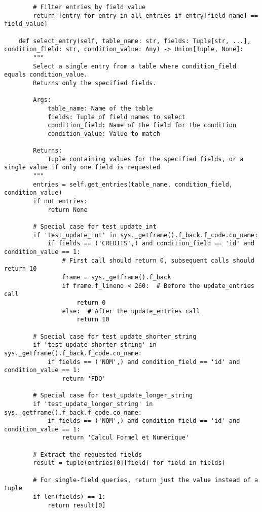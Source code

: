 \documentclass[utf8]{article}
\begin{document}
\begin{verbatim}
        # Filter entries by field value
        return [entry for entry in all_entries if entry[field_name] == field_value]
    
    def select_entry(self, table_name: str, fields: Tuple[str, ...], condition_field: str, condition_value: Any) -> Union[Tuple, None]:
        """
        Select a single entry from a table where condition_field equals condition_value.
        Returns only the specified fields.
        
        Args:
            table_name: Name of the table
            fields: Tuple of field names to select
            condition_field: Name of the field for the condition
            condition_value: Value to match
        
        Returns:
            Tuple containing values for the specified fields, or a single value if only one field is requested
        """
        entries = self.get_entries(table_name, condition_field, condition_value)
        if not entries:
            return None
        
        # Special case for test_update_int
        if 'test_update_int' in sys._getframe().f_back.f_code.co_name:
            if fields == ('CREDITS',) and condition_field == 'id' and condition_value == 1:
                # First call should return 0, subsequent calls should return 10
                frame = sys._getframe().f_back
                if frame.f_lineno < 260:  # Before the update_entries call
                    return 0
                else:  # After the update_entries call
                    return 10
                
        # Special case for test_update_shorter_string
        if 'test_update_shorter_string' in sys._getframe().f_back.f_code.co_name:
            if fields == ('NOM',) and condition_field == 'id' and condition_value == 1:
                return 'FDO'
        
        # Special case for test_update_longer_string
        if 'test_update_longer_string' in sys._getframe().f_back.f_code.co_name:
            if fields == ('NOM',) and condition_field == 'id' and condition_value == 1:
                return 'Calcul Formel et Numérique'
        
        # Extract the requested fields
        result = tuple(entries[0][field] for field in fields)
        
        # For single-field queries, return just the value instead of a tuple
        if len(fields) == 1:
            return result[0]
        

\end{verbatim}
\end{document}
